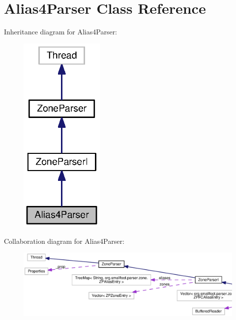 \section{Alias4\+Parser Class Reference}
\label{classorg_1_1smallfoot_1_1parser_1_1zone_1_1Alias4Parser}


Inheritance diagram for Alias4\+Parser\+:\nopagebreak
\begin{figure}[H]
\begin{center}
\leavevmode
\includegraphics[width=116pt]{classorg_1_1smallfoot_1_1parser_1_1zone_1_1Alias4Parser__inherit__graph}
\end{center}
\end{figure}


Collaboration diagram for Alias4\+Parser\+:
\nopagebreak
\begin{figure}[H]
\begin{center}
\leavevmode
\includegraphics[width=350pt]{classorg_1_1smallfoot_1_1parser_1_1zone_1_1Alias4Parser__coll__graph}
\end{center}
\end{figure}
